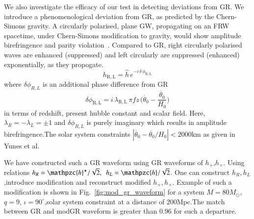 \documentclass[prl,preprintnumbers,twocolumn,eqsecnum,floatfix,a4paper,nofootinbib,superscriptaddress]{revtex4}
\newcommand{\h}{\mathpzc{h}}
\begin{document}
We also investigate the efficacy of our test in detecting deviations from GR. We introduce a phenomenological deviation from GR, as predicted by the Chern-Simons gravity. A circularly polarised, plane GW, propagating on
an FRW spacetime, under Chern-Simons
modification to gravity, would show amplitude
birefringence and parity violation~\cite{yunes:2010xx}. Compared to GR, right circularly polarised waves are enhanced (suppressed) and left circularly are suppressed (enhanced) exponentially, as they propogate.
% 
\begin{equation}
h_\mathrm{R,L} = \hat{h} \, e^{-i \, \delta \, \phi_\mathrm{R,L}}
\end{equation}
where $\delta \phi_{R,L}$ is an additional phase difference from GR
\begin{equation}
\delta \phi_\mathrm{R,L}=i \, \lambda_\mathrm{R,L} \, \pi f z \, \Big(\dot{\theta_0}-\frac{\ddot{\theta_0}}{H_0}\Big)
\end{equation}
in terms of redshift, present hubble constant and scalar field. Here, $\lambda_{R}=-\lambda_{L}=\pm1$ and $\delta \phi_{R,L}$ is purely imaginary which results in amplitude birefringence.The solar system constraints $|\dot{\theta_0}-\ddot{\theta_0}/{H_0}|<2000$km as given in Yunes et al.

We have constructed such a GR waveform using GR waveforms of $h_+$,$h_{\times}$. Using relations $h_R= \h^\star/\sqrt{2}, ~~ h_L= \h/\sqrt{2}$. One can construct $h_R,h_L$,introduce modification and reconstruct modified $h_+,h_{\times}$. Example of such a modification is shown in Fig.~\ref{fig:mod_gr_waveform} for a system $M = 80M_{\odot}$, $q =9$, $\iota = 90^{\circ}$,solar system constraint at a distance of 200Mpc.The match between GR and modGR waveform is greater than 0.96 for such a departure.
\end{document}
